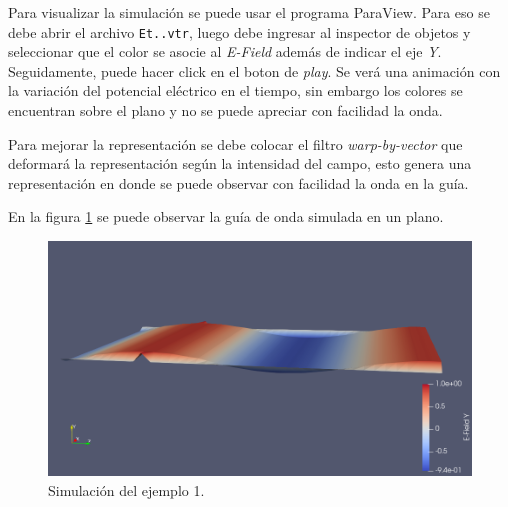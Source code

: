 \documentclass[
    11pt,
    spanish,
	a4paper
]{article}
\begin{document}
Para visualizar la simulación se puede usar el programa ParaView. Para eso se
debe abrir el archivo \texttt{Et..vtr}, luego debe ingresar al inspector de
objetos y seleccionar que el color se asocie al \emph{E-Field} además de indicar
el eje \emph{Y}. Seguidamente,
puede hacer click en el boton de \emph{play}.
Se verá una animación con la variación del potencial eléctrico en el tiempo, sin
embargo los colores se encuentran sobre el plano y no se puede apreciar con
facilidad la onda.

Para mejorar la representación se debe colocar el filtro \emph{warp-by-vector}
que deformará la representación según la intensidad del campo, esto genera una
representación en donde se puede observar con facilidad la onda en la guía.

En la figura \ref{fig:sim1} se puede observar la guía de onda simulada en un plano.

\begin{figure}[htbp]
	\centering
	\includegraphics[width=\textwidth]{./img/sim1.png}
	\caption{Simulación del ejemplo 1.}
	\label{fig:sim1}
\end{figure}
\end{document}
